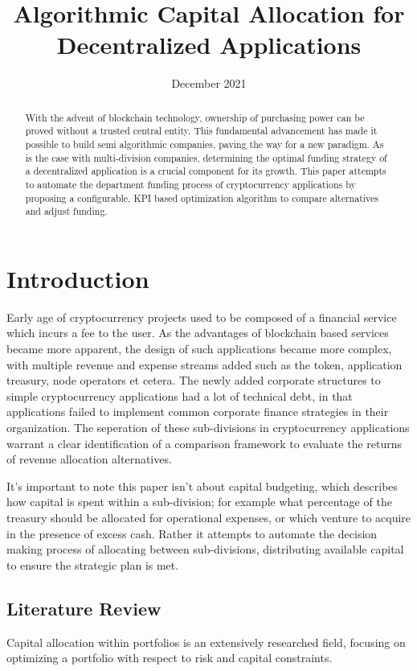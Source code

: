 \documentclass[conference,letterpaper]{IEEEtran}
\title{Algorithmic Capital Allocation for Decentralized Applications}
\author{\IEEEauthorblockN{Orhan Koc}
    \IEEEauthorblockA{ hankoc@onchainfactory.com} }
\date{December 2021}
\begin{document}
    \maketitle
    \begin{abstract}
        With the advent of blockchain technology, ownership of purchasing power can be
        proved without a trusted central entity. This fundamental advancement has made it
        possible to build semi algorithmic companies, paving the way for a new paradigm.
        As is the case with multi-division companies, determining the optimal funding
        strategy of a decentralized application is a crucial component for its growth.
        This paper attempts to automate the department funding process of cryptocurrency
        applications by proposing a configurable, KPI based optimization algorithm to
        compare alternatives and adjust funding.
    \end{abstract}

    \section{Introduction}
        Early age of cryptocurrency projects used to be composed of a financial service
        which incurs a fee to the user. As the advantages of blockchain based services
        became more apparent, the design of such applications became more complex, with
        multiple revenue and expense streams added such as the token, application
        treasury, node operators et cetera. The newly added corporate structures to simple
        cryptocurrency applications had a lot of technical debt, in that applications
        failed to implement common corporate finance strategies in their organization. The
        seperation of these sub-divisions in cryptocurrency applications warrant a clear
        identification of a comparison framework to evaluate the returns of revenue
        allocation alternatives. 
        
        It's important to note this paper isn't about capital budgeting, which describes
        how capital is spent within a sub-division; for example what percentage of the
        treasury should be allocated for operational expenses, or which venture to acquire
        in the presence of excess cash. Rather it attempts to automate the decision making
        process of allocating between sub-divisions, distributing available capital to
        ensure the strategic plan is met.

        \subsection{Literature Review}
            Capital allocation within portfolios is an extensively researched field,
            focusing on optimizing a portfolio with respect to risk and capital
            constraints. 
\end{document}
